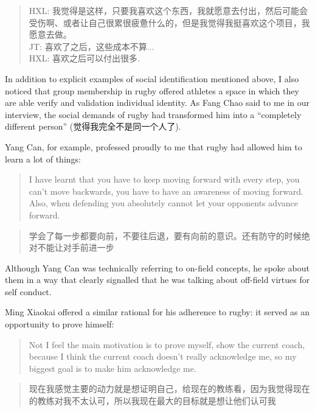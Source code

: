 \begin{CJK}{UTF8}{gbsn}
    \begin{quotation}
      HXL: 我觉得是这样，只要我喜欢这个东西，我就愿意去付出，然后可能会受伤啊、或者让自己很累很疲惫什么的，但是我觉得我挺喜欢这个项目，我愿意去做。\\
      JT: 喜欢了之后，这些成本不算...\\
      HXL: 喜欢之后可以付出很多.
    \end{quotation}




In addition to explicit examples of social identification mentioned above, I also noticed that group membership in rugby offered athletes a space in which they are able verify and validation individual identity.  As Fang Chao said to me in our interview, the social demands of rugby had transformed him into a ``completely different person'' (觉得我完全不是同一个人了).

Yang Can, for example, professed proudly to me that rugby had allowed him to learn a lot of things:

\begin{quotation}
    I have learnt that you have to keep moving forward with every step, you can’t move backwards, you have to have an awareness of moving forward.  Also, when defending you absolutely cannot let your opponents advance forward.
\end{quotation}

\begin{quotation}
    学会了每一步都要向前，不要往后退，要有向前的意识。还有防守的时候绝对不能让对手前进一步
\end{quotation}

Although Yang Can was technically referring to on-field concepts, he spoke about them in a way that clearly signalled that he was talking about off-field virtues for self conduct.

Ming Xiaokai offered a similar rational for his adherence to rugby: it served as an opportunity to prove himself:

  \begin{quotation}
    Not I feel the main motivation is to prove myself, show the current coach, because I think the current coach doesn't really acknowledge me, so my biggest goal is to make him acknowledge me.
  \end{quotation}

  \begin{quotation}
    现在我感觉主要的动力就是想证明自己，给现在的教练看，因为我觉得现在的教练对我不太认可，所以我现在最大的目标就是想让他们认可我
  \end{quotation}





\end{CJK}
